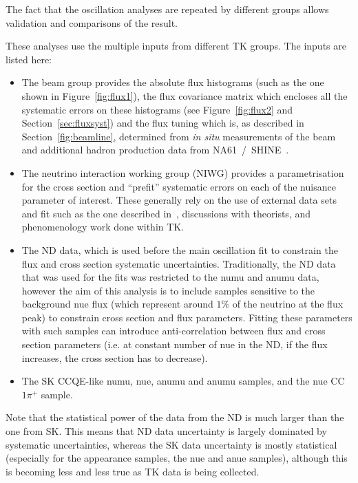The fact that the oscillation analyses are repeated by different
groups allows validation and comparisons of the result.

These analyses use the multiple inputs from different \Gls{TK}
groups. The inputs are listed here:
\begin{itemize}
\item The beam group provides the absolute flux histograms (such as
  the one shown in Figure~\ref{fig:flux1}), the flux covariance matrix
  which encloses all the systematic errors on these histograms (see
  Figure~\ref{fig:flux2} and Section~\ref{sec:fluxsyst}) and the flux
  tuning which is, as described in Section~\ref{fig:beamline},
  determined from {\it in situ} measurements of the beam and
  additional hadron production data from
  NA61~/~SHINE~\cite{Abgrall:2011ae,Abgrall:2011ts,Abgrall:2015hmv}.
\item The neutrino interaction working group (\Gls{NIWG}) provides a
  parametrisation for the cross section and ``prefit'' systematic
  errors on each of the nuisance parameter of interest. These
  generally rely on the use of external data sets and fit such as the
  one described in~\cite{CallumFit}, discussions with theorists, and
  phenomenology work done within \Gls{TK}.
\item The \Gls{ND} data, which is used before the main oscillation fit
  to constrain the flux and cross section systematic
  uncertainties. Traditionally, the \Gls{ND} data that was used for
  the fits was restricted to the \Gls{numu} and \Gls{anumu} data,
  however the aim of this analysis is to include samples sensitive to
  the background \Gls{nue} flux (which represent around $1\%$ of the
  neutrino at the flux peak) to constrain cross section and flux
  parameters. Fitting these parameters with such samples can introduce
  anti-correlation between flux and cross section parameters (i.e. at
  constant number of \Gls{nue} in the \Gls{ND}, if the flux increases,
  the cross section has to decrease).
\item The \Gls{SK} \Gls{CCQE}-like \gls{numu}, \gls{nue}, \gls{anumu}
  and \gls{anumu} samples, and the \Gls{nue} \Gls{CC}$1\pi^+$ sample.
\end{itemize}

Note that the statistical power of the data from the \Gls{ND} is much
larger than the one from \Gls{SK}. This means that \Gls{ND} data
uncertainty is largely dominated by systematic uncertainties, whereas
the \Gls{SK} data uncertainty is mostly statistical (especially for
the appearance samples, the \gls{nue} and \gls{anue} samples),
although this is becoming less and less true as \Gls{TK} data is being
collected.

